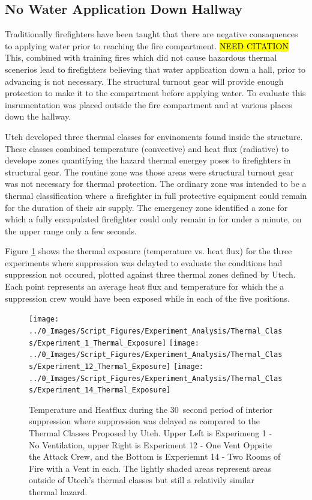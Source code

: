 \documentclass[12pt,oneside]{book}
\begin{document}

\subsection{No Water Application Down Hallway}
Traditionally firefighters have been taught that there are negative consaquences to applying water prior to reaching the fire compartment. \hl{NEED CITATION} This, combined with training fires which did not cause hazardous thermal scenerios lead to firefighters believing that water application down a hall, prior to advancing is not necessary. The structural turnout gear will provide enough protection to make it to the compartment before applying water. To evaluate this insrumentation was placed outside the fire compartment and at various places down the hallway.

Uteh developed three thermal classes for envinoments found inside the structure. These classes combined temperature (convective) and heat flux (radiative) to develope zones quantifying the hazard thermal energey poses to firefighters in structural gear. The routine zone was those areas were structural turnout gear was not necessary for thermal protection. The ordinary zone was intended to be a thermal classification where a firefighter in full protective equipment could remain for the duration of their air supply. The emergency zone identified a zone for which a fully encapulated firefighter could only remain in for under a minute, on the upper range only a few seconds.  

Figure \ref{fig:Thermal_Classes_Approach_Delayed_Suppression} shows the thermal exposure (temperature vs. heat flux) for the three experiments where suppression was delayted to evaluate the conditions had suppression not occured, plotted against three thermal zones defined by Utech. Each point represents an average heat flux and temperature for which the a suppression crew would have been exposed while in each of the five positions. 

\begin{figure}[H]
\centering
\texttt{[image: ../0\_Images/Script\_Figures/Experiment\_Analysis/Thermal\_Class/Experiment\_1\_Thermal\_Exposure]} 
\texttt{[image: ../0\_Images/Script\_Figures/Experiment\_Analysis/Thermal\_Class/Experiment\_12\_Thermal\_Exposure]}
\texttt{[image: ../0\_Images/Script\_Figures/Experiment\_Analysis/Thermal\_Class/Experiment\_14\_Thermal\_Exposure]} 
\caption[Delayed Suppression Hallway Thermal Class Comparison]{Temperature and Heatflux during the 30~second period of interior suppression where suppression was delayed as compared to the Thermal Classes Proposed by Uteh. Upper Left is Experimeng 1 - No Ventilation, upper Right is Experiment 12 - One Vent Oppsite the Attack Crew, and the Bottom is Experiemnt 14 - Two Rooms of Fire with a Vent in each. The lightly shaded areas represent areas outside of Utech's thermal classes but still a relativily similar thermal hazard.}
\label{fig:Thermal_Classes_Approach_Delayed_Suppression}
\end{figure}
\end{document}
